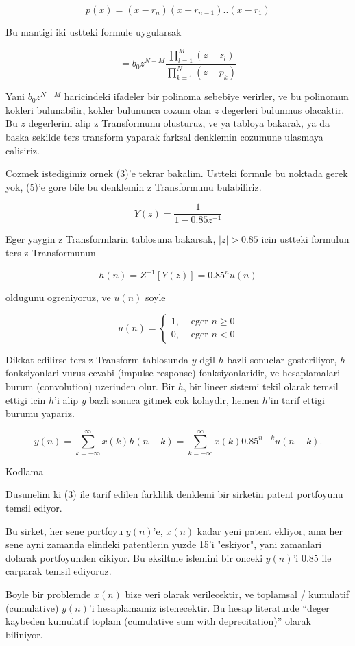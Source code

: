 \documentclass[12pt,fleqn]{article}\usepackage{../common}
\begin{document}
$$ p(x) = (x-r_n)(x-r_{n-1})..(x-r_1) $$

Bu mantigi iki ustteki formule uygularsak 

$$ = b_0 z^{N - M} 
\frac{\prod_{l=1}^{M}(z-z_l)}{ \prod_{k=1}^{N}(z-p_k) }
$$

Yani $b_0z^{N-M}$ haricindeki ifadeler bir polinoma sebebiye verirler, ve
bu polinomun kokleri bulunabilir, kokler bulununca cozum olan $z$ degerleri
bulunmus olacaktir. Bu $z$ degerlerini alip z Transformunu olusturuz, ve ya
tabloya bakarak, ya da baska sekilde ters transform yaparak farksal
denklemin cozumune ulasmaya calisiriz. 

Cozmek istedigimiz ornek (3)'e tekrar bakalim. Ustteki formule bu noktada
gerek yok, (5)'e gore bile bu denklemin z Transformunu bulabiliriz. 

$$ Y(z) = \frac{1}{1-0.85z^{-1}} $$

Eger yaygin z Transformlarin tablosuna bakarsak, $|z|>0.85$ icin ustteki
formulun ters z Transformunun 

$$ h(n) = Z^{-1} [Y(z)] = 0.85^nu(n) $$

oldugunu ogreniyoruz, ve $u(n)$ soyle 

$$
u(n) = 
\left\{ \begin{array}{ll}
1, & \textrm{ eger } n \ge 0 \\ 
0, & \textrm{ eger } n < 0
\end{array} \right.
$$

Dikkat edilirse ters z Transform tablosunda $y$ dgil $h$ bazli sonuclar
gosteriliyor, $h$ fonksiyonlari vurus cevabi (impulse response)
fonksiyonlaridir, ve hesaplamalari burum (convolution) uzerinden olur. Bir
$h$, bir lineer sistemi tekil olarak temsil ettigi icin $h$'i alip $y$
bazli sonuca gitmek cok kolaydir, hemen $h$'in tarif ettigi burumu
yapariz. 

$$ y(n) = \sum_{k=-\infty}^\infty x(k) h(n-k) = \sum_{k=-\infty}^\infty x(k) 0.85^{n-k} u(n-k). $$ 

Kodlama

Dusunelim ki (3) ile tarif edilen farklilik denklemi bir sirketin patent
portfoyunu temsil ediyor. 

Bu sirket, her sene portfoyu $y(n)$'e, $x(n)$ kadar yeni patent ekliyor,
ama her sene ayni zamanda elindeki patentlerin yuzde 15'i "eskiyor", yani
zamanlari dolarak portfoyunden cikiyor. Bu eksiltme islemini bir onceki
$y(n)$'i 0.85 ile carparak temsil ediyoruz. 

Boyle bir problemde $x(n)$ bize veri olarak verilecektir, ve toplamsal /
kumulatif (cumulative) $y(n)$'i hesaplamamiz istenecektir. Bu hesap
literaturde ``deger kaybeden kumulatif toplam (cumulative sum with
deprecitation)'' olarak biliniyor.
\end{document}
